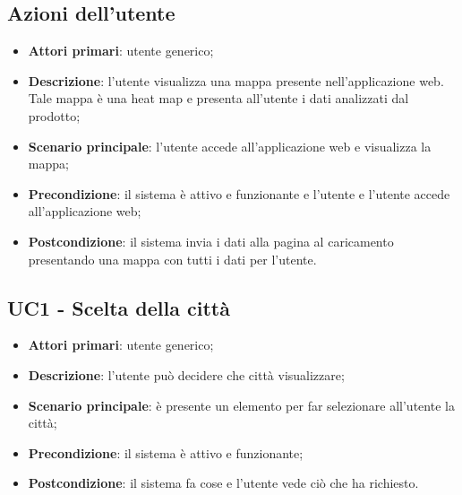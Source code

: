 \subsection{Azioni dell'utente}
\begin{itemize}
	\item \textbf{Attori primari}: utente generico;
	\item \textbf{Descrizione}: l'utente visualizza una mappa presente nell'applicazione web. Tale mappa è una heat map e presenta all'utente i dati analizzati dal prodotto;
	\item \textbf{Scenario principale}: l'utente accede all'applicazione web e visualizza la mappa;
	\item \textbf{Precondizione}: il sistema è attivo e funzionante e l'utente e l'utente accede all'applicazione web;
	\item \textbf{Postcondizione}: il sistema invia i dati alla pagina al caricamento presentando una mappa con tutti i dati per l'utente.
\end{itemize}

\subsection{UC1 - Scelta della città}
\begin{itemize}
\item \textbf{Attori primari}: utente generico;
\item \textbf{Descrizione}: l'utente può decidere che città visualizzare;
\item \textbf{Scenario principale}: è presente un elemento per far selezionare all'utente la città;
\item \textbf{Precondizione}: il sistema è attivo e funzionante;
\item \textbf{Postcondizione}: il sistema fa cose e l'utente vede ciò che ha richiesto.
\end{itemize}

